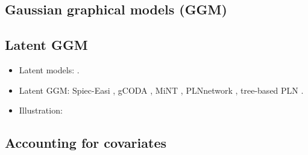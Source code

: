 \subsection{Gaussian graphical models (GGM)}

\subsection{Latent GGM}

\begin{itemize}
 \item Latent models: \cite{WBO15}. 
 \item Latent GGM: Spiec-Easi \citep{KMM15}, gCODA \citep{FHZ17}, MiNT \citep{BML16}, PLNnetwork \citep{CMR18b}, tree-based PLN \citep{MRA19}.
 \item Illustration: \cite{JFS16}
\end{itemize}


\subsection{Accounting for covariates}

